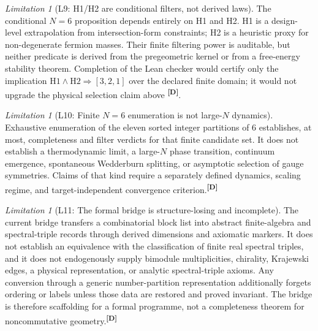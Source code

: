\documentclass[12pt,a4paper,twoside]{article}
\theoremstyle{plain}
\theoremstyle{definition}
\theoremstyle{remark}
\newtheorem{limitation}[theorem]{Limitation}
\newcommand{\catmark}[1]{\textsuperscript{\textsf{\textbf{[#1]}}}}
\begin{document}
\begin{limitation}[L9: H1/H2 are conditional filters, not derived laws]
\label{lim:L9}
The conditional $N=6$ proposition depends entirely on H1 and H2.
H1 is a design-level extrapolation from intersection-form constraints;
H2 is a heuristic proxy for non-degenerate fermion masses. Their finite
filtering power is auditable, but neither predicate is derived from the
pregeometric kernel or from a free-energy stability theorem. Completion
of the Lean checker would certify only the implication
$\mathrm{H1}\wedge\mathrm{H2}\Rightarrow[3,2,1]$ over the declared finite
domain; it would not upgrade the physical selection claim above
\catmark{D}.
\end{limitation}

\begin{limitation}[L10: Finite $N=6$ enumeration is not large-$N$ dynamics]
\label{lim:L10}
Exhaustive enumeration of the eleven sorted integer partitions of $6$
establishes, at most, completeness and filter verdicts for that finite
candidate set. It does not establish a thermodynamic limit, a
large-$N$ phase transition, continuum emergence, spontaneous
Wedderburn splitting, or asymptotic selection of gauge symmetries.
Claims of that kind require a separately defined dynamics, scaling
regime, and target-independent convergence criterion.\catmark{D}
\end{limitation}

\begin{limitation}[L11: The formal bridge is structure-losing and incomplete]
\label{lim:L11}
The current bridge transfers a combinatorial block list into abstract
finite-algebra and spectral-triple records through derived dimensions
and axiomatic markers. It does not establish an equivalence with the
classification of finite real spectral triples, and it does not
endogenously supply bimodule multiplicities, chirality, Krajewski edges,
a physical representation, or analytic spectral-triple axioms. Any
conversion through a generic number-partition representation additionally
forgets ordering or labels unless those data are restored and proved
invariant. The bridge is therefore scaffolding for a formal programme,
not a completeness theorem for noncommutative geometry.\catmark{D}
\end{limitation}
\end{document}
